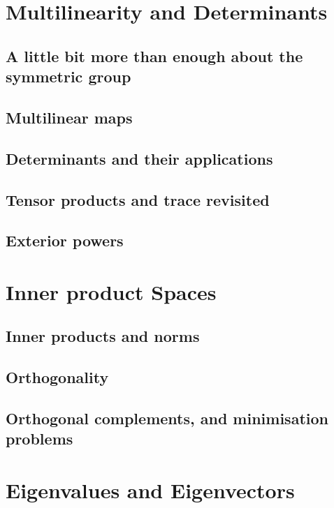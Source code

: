 \documentclass{book}
\theoremstyle{plain}
\theoremstyle{definition}
\theoremstyle{remark}
\begin{document}
\chapter{Multilinearity and Determinants} \label{chapter_multilinear}

\section{A little bit more than enough about the symmetric group}

\section{Multilinear maps}

\section{Determinants and their applications}

\section{Tensor products and trace revisited}

\section{Exterior powers}

\chapter{Inner product Spaces}

\section{Inner products and norms}

\section{Orthogonality}

\section{Orthogonal complements, and minimisation problems}

\chapter{Eigenvalues and Eigenvectors}
\end{document}
